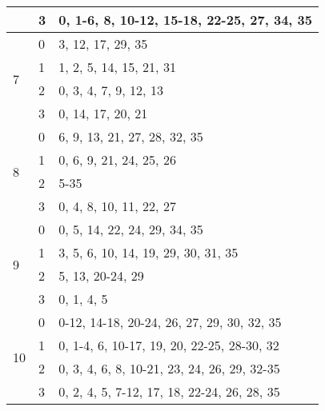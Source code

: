 \begin{table}[htb!]
\begin{tabular}{@{} lll @{}}
    & 3 & 0, 1-6, 8, 10-12, 15-18, 22-25, 27, 34, 35\\
    \midrule
    \multirow{4}{*}{7} & 0 & 3, 12, 17, 29, 35\\
    & 1 & 1, 2, 5, 14, 15, 21, 31\\
    & 2 & 0, 3, 4, 7, 9, 12, 13\\
    & 3 & 0, 14, 17, 20, 21\\
    \midrule
    \multirow{4}{*}{8} & 0 & 6, 9, 13, 21, 27, 28, 32, 35\\
    & 1 & 0, 6, 9, 21, 24, 25, 26\\
    & 2 & 5-35\\
    & 3 & 0, 4, 8, 10, 11, 22, 27\\
    \midrule
    \multirow{4}{*}{9} & 0 & 0, 5, 14, 22, 24, 29, 34, 35\\
    & 1 & 3, 5, 6, 10, 14, 19, 29, 30, 31, 35\\
    & 2 & 5, 13, 20-24, 29\\
    & 3 & 0, 1, 4, 5\\
    \midrule
    \multirow{4}{*}{10} & 0 & 0-12, 14-18, 20-24, 26, 27, 29, 30, 32, 35\\
    & 1 & 0, 1-4, 6, 10-17, 19, 20, 22-25, 28-30, 32\\
    & 2 & 0, 3, 4, 6, 8, 10-21, 23, 24, 26, 29, 32-35\\
    & 3 & 0, 2, 4, 5, 7-12, 17, 18, 22-24, 26, 28, 35\\
    \bottomrule
  \end{tabular}
\end{table}

